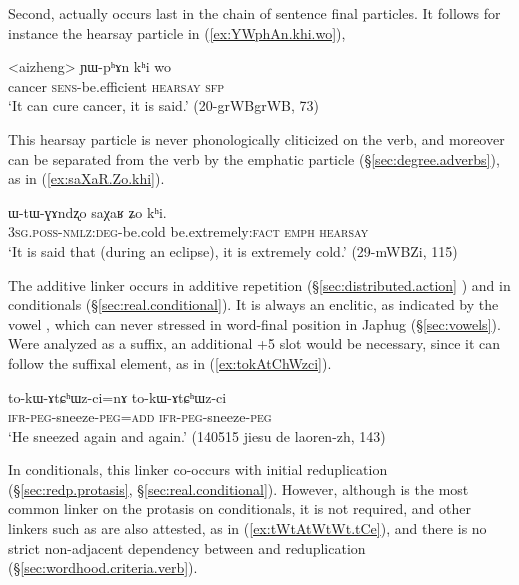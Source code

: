 Second,  actually occurs last in the chain of sentence final particles. It follows for instance the hearsay particle  in (\ref{ex:YWphAn.khi.wo}), 

\begin{exe}
\ex \label{ex:YWphAn.khi.wo}
\gll <aizheng> ɲɯ-pʰɤn kʰi wo\\
cancer \textsc{sens}-be.efficient \textsc{hearsay} \textsc{sfp} \\
\glt `It can cure cancer, it is said.' (20-grWBgrWB, 73)
\end{exe}

This hearsay particle is never phonologically cliticized on the verb, and moreover can be separated from the verb by the emphatic particle  (§\ref{sec:degree.adverbs}), as in (\ref{ex:saXaR.Zo.khi}).

\begin{exe}
\ex \label{ex:saXaR.Zo.khi}
\gll ɯ-tɯ-ɣɤndʐo saχaʁ ʑo kʰi. \\
\textsc{3sg}.\textsc{poss}-\textsc{nmlz}:\textsc{deg}-be.cold be.extremely:\textsc{fact} \textsc{emph} \textsc{hearsay} \\
\glt `It is said that (during an eclipse), it is extremely cold.' (29-mWBZi, 115)
\end{exe}

The additive linker  occurs in additive repetition (§\ref{sec:distributed.action} ) and in conditionals (§\ref{sec:real.conditional}). It is always an enclitic, as indicated by the vowel , which can never stressed in word-final position in Japhug (§\ref{sec:vowels}).  Were  analyzed as a suffix, an additional +5 slot would be necessary, since it can follow the  suffixal element, as in (\ref{ex:tokAtChWzci}).

\begin{exe}
\ex \label{ex:tokAtChWzci}
\gll to-kɯ-ɤtɕʰɯz-ci=nɤ to-kɯ-ɤtɕʰɯz-ci \\
\textsc{ifr}-\textsc{peg}-sneeze-\textsc{peg}=\textsc{add} \textsc{ifr}-\textsc{peg}-sneeze-\textsc{peg}  \\
\glt `He sneezed again and again.' (140515 jiesu de laoren-zh, 143)
\end{exe}

In conditionals, this linker co-occurs with initial reduplication (§\ref{sec:redp.protasis}, §\ref{sec:real.conditional}). However, although  is the most common linker on the protasis on conditionals, it is not required, and other linkers such as  are also attested, as in (\ref{ex:tWtAtWtWt.tCe}), and there is no strict non-adjacent dependency between  and reduplication (§\ref{sec:wordhood.criteria.verb}).


